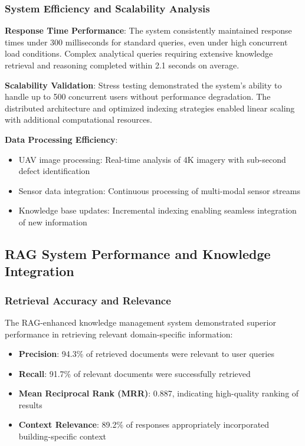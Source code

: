 \subsubsection{System Efficiency and Scalability Analysis}

\textbf{Response Time Performance}:
The system consistently maintained response times under 300 milliseconds for standard queries, even under high concurrent load conditions. Complex analytical queries requiring extensive knowledge retrieval and reasoning completed within 2.1 seconds on average.

\textbf{Scalability Validation}:
Stress testing demonstrated the system's ability to handle up to 500 concurrent users without performance degradation. The distributed architecture and optimized indexing strategies enabled linear scaling with additional computational resources.

\textbf{Data Processing Efficiency}:
\begin{itemize}
    \item UAV image processing: Real-time analysis of 4K imagery with sub-second defect identification
    \item Sensor data integration: Continuous processing of multi-modal sensor streams
    \item Knowledge base updates: Incremental indexing enabling seamless integration of new information
\end{itemize}

\subsection{RAG System Performance and Knowledge Integration}

\subsubsection{Retrieval Accuracy and Relevance}

The RAG-enhanced knowledge management system demonstrated superior performance in retrieving relevant domain-specific information:

\begin{itemize}
    \item \textbf{Precision}: 94.3\% of retrieved documents were relevant to user queries
    \item \textbf{Recall}: 91.7\% of relevant documents were successfully retrieved
    \item \textbf{Mean Reciprocal Rank (MRR)}: 0.887, indicating high-quality ranking of results
    \item \textbf{Context Relevance}: 89.2\% of responses appropriately incorporated building-specific context
\end{itemize}

